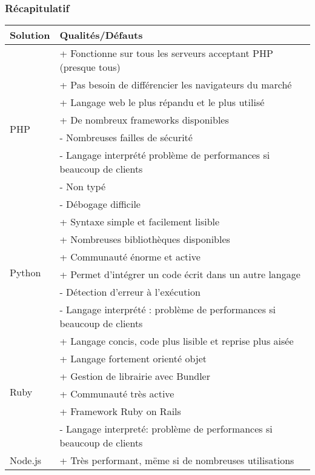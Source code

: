        \subsubsection{Récapitulatif}
        \label{recap}
        \begin{tabular}{|l|l|}
            \hline
            Solution & Qualités/Défauts \\ \hline
            \multirow{8}{*}{PHP} & + Fonctionne sur tous les serveurs acceptant PHP (presque tous) \\
                & + Pas besoin de différencier les navigateurs du marché \\
                & + Langage web le plus répandu et le plus utilisé \\
                & + De nombreux frameworks disponibles \\
                & - Nombreuses failles de sécurité \\
                & - Langage interprété problème de performances si beaucoup de clients \\
                & - Non typé \\
                & - Débogage difficile \\ \hline
            \multirow{6}{*}{Python} & + Syntaxe simple et facilement lisible \\
                & + Nombreuses bibliothèques disponibles \\
                & + Communauté énorme et active \\
                & + Permet d’intégrer un code écrit dans un autre langage \\
                & - Détection d’erreur à l’exécution \\
                & - Langage interprété : problème de performances si beaucoup de clients \\ \hline
            \multirow{6}{*}{Ruby} & + Langage concis, code plus lisible et reprise plus aisée \\
                & + Langage fortement orienté objet \\
                & + Gestion de librairie avec Bundler \\
                & + Communauté très active \\
                & + Framework Ruby on Rails \\
                & - Langage interpreté: problème de performances si beaucoup de clients \\ \hline
            \multirow{5}{*}{Node.js} & + Très performant, mëme si de nombreuses utilisations \\

\end{tabular}
